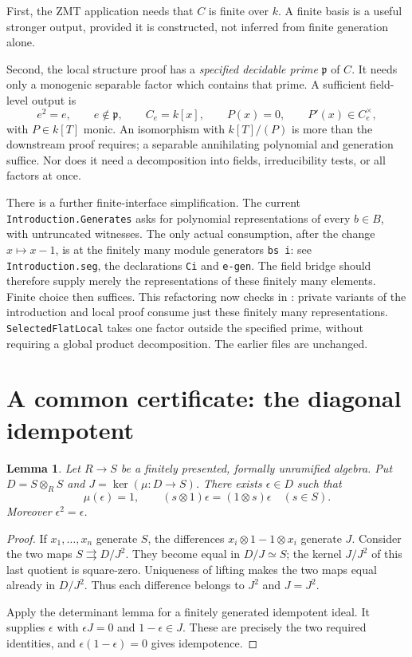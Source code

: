 \documentclass[11pt]{article}
\newtheorem{lemma}[proposition]{Lemma}
\newcommand{\kerop}{\operatorname{ker}}
\begin{document}
First, the ZMT application needs that $C$ is finite over $k$.
A finite basis is a useful stronger output, provided it is constructed,
not inferred from finite generation alone.

Second, the local structure proof has a \emph{specified decidable prime}
$\mathfrak p$ of $C$.  It needs only a monogenic separable factor which
contains that prime.  A sufficient field-level output is
\[
 e^2=e,\qquad e\notin\mathfrak p,\qquad
 C_e=k[x],\qquad P(x)=0,\qquad P'(x)\in C_e^\times,
\]
with $P\in k[T]$ monic.  An isomorphism with $k[T]/(P)$ is more than
the downstream proof requires; a separable annihilating polynomial
and generation suffice.  Nor does it need a decomposition into fields,
irreducibility tests, or all factors at once.

There is a further finite-interface simplification.  The current
\texttt{Introduction.Generates} asks for polynomial representations
of every $b\in B$, with untruncated witnesses.  The only actual
consumption, after the change $x\mapsto x-1$, is at the finitely many
module generators \texttt{bs i}: see \texttt{Introduction.seg}, the
declarations \texttt{Ci} and \texttt{e-gen}.  The field bridge should
therefore supply merely the representations of these finitely many
elements.  Finite choice then suffices. This refactoring now checks in
: private variants of the introduction
and local proof consume just these finitely many representations.
\texttt{SelectedFlatLocal} takes one factor outside the specified prime,
without requiring a global product decomposition. The earlier files
are unchanged.

\section{A common certificate: the diagonal idempotent}

\begin{lemma}\label{diagonal}
Let $R\to S$ be a finitely presented, formally unramified algebra.
Put $D=S\otimes_R S$ and $J=\kerop(\mu:D\to S)$.
There exists $\epsilon\in D$ such that
\[
 \mu(\epsilon)=1,\qquad
 (s\otimes1)\epsilon=(1\otimes s)\epsilon\quad(s\in S).
\]
Moreover $\epsilon^2=\epsilon$.
\end{lemma}
\begin{proof}
If $x_1,\ldots,x_n$ generate $S$, the differences
$x_i\otimes1-1\otimes x_i$ generate $J$.
Consider the two maps $S\rightrightarrows D/J^2$.
They become equal in $D/J\simeq S$; the kernel $J/J^2$ of this last
quotient is square-zero.  Uniqueness of lifting makes the two maps
equal already in $D/J^2$.  Thus each difference belongs to $J^2$ and
$J=J^2$.

Apply the determinant lemma for a finitely generated idempotent ideal.
It supplies $\epsilon$ with $\epsilon J=0$ and $1-\epsilon\in J$.
These are precisely the two required identities, and
$\epsilon(1-\epsilon)=0$ gives idempotence.
\end{proof}
\end{document}
